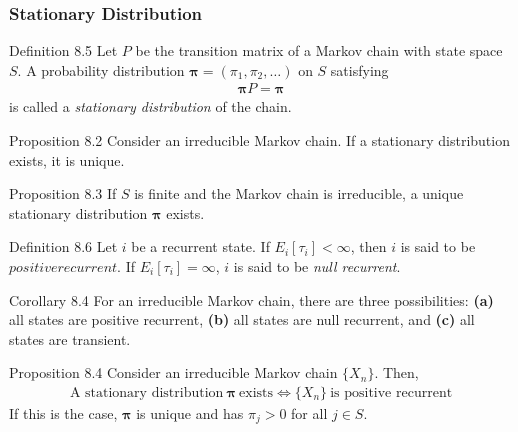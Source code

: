 \subsubsection{Stationary Distribution}
\begin{boks}{Definition 8.5}
  Let $P$ be the transition matrix of a Markov chain with state space $S$. A probability distribution $\boldsymbol{\pi} = (\pi_1, \pi_2, \ldots)$ on $S$ satisfying
  \begin{align*}
    \boldsymbol{\pi} P = \boldsymbol{\pi}
  \end{align*}
  is called a \textit{stationary distribution} of the chain.
\end{boks}
\begin{boks}{Proposition 8.2}
  Consider an irreducible Markov chain. If a stationary distribution exists, it is unique.
\end{boks}
\begin{boks}{Proposition 8.3}
  If $S$ is finite and the Markov chain is irreducible, a unique stationary distribution $\boldsymbol{\pi}$ exists.
\end{boks}
\begin{boks}{Definition 8.6}
  Let $i$ be a recurrent state. If $E_i[\tau_i] < \infty$, then $i$ is said to be $positive recurrent$. If $E_i[\tau_i] = \infty$, $i$ is said to be \textit{null recurrent}.
\end{boks}
\begin{boks}{Corollary 8.4}
  For an irreducible Markov chain, there are three possibilities: \textbf{(a)} all states are positive recurrent, \textbf{(b)} all states are null recurrent, and \textbf{(c)} all states are transient.
\end{boks}
\begin{boks}{Proposition 8.4}
  Consider an irreducible Markov chain $\{ X_n \}$. Then,
  \begin{align*}
    \text{A stationary distribution} \ \boldsymbol{\pi} \ \text{exists} \Leftrightarrow \{ X_n \} \ \text{is positive recurrent}
  \end{align*}
  If this is the case, $\boldsymbol{\pi}$ is unique and has $\pi_j > 0$ for all $j \in S$.
\end{boks}

